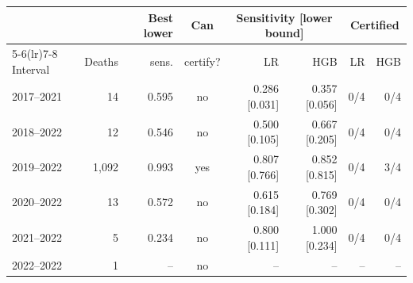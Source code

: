 \begin{tabular}{lrrcrrrr}
\toprule
 & & Best lower & Can & \multicolumn{2}{c}{Sensitivity [lower bound]} & \multicolumn{2}{c}{Certified} \\
\cmidrule(lr){5-6}\cmidrule(lr){7-8}
Interval & Deaths & sens. & certify? & LR & HGB & LR & HGB \\
\midrule
2017--2021 & 14 & 0.595 & no & 0.286 [0.031] & 0.357 [0.056] & 0/4 & 0/4 \\
2018--2022 & 12 & 0.546 & no & 0.500 [0.105] & 0.667 [0.205] & 0/4 & 0/4 \\
2019--2022 & 1,092 & 0.993 & yes & 0.807 [0.766] & 0.852 [0.815] & 0/4 & 3/4 \\
2020--2022 & 13 & 0.572 & no & 0.615 [0.184] & 0.769 [0.302] & 0/4 & 0/4 \\
2021--2022 & 5 & 0.234 & no & 0.800 [0.111] & 1.000 [0.234] & 0/4 & 0/4 \\
2022--2022 & 1 & -- & no & -- & -- & -- & -- \\
\bottomrule
\end{tabular}
